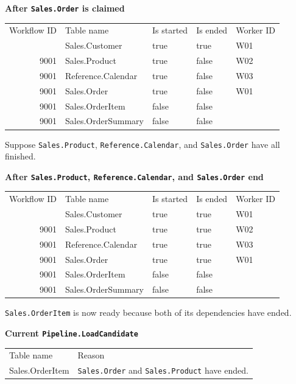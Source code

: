 \documentclass[10pt,openany,10pt]{book}
\newcounter{none}
\let\podeToprule\toprule
\let\podeMidrule\midrule
\let\podeBottomrule\bottomrule
\renewcommand{\toprule}{\arrayrulecolor{pbiGrid}\podeToprule}
\renewcommand{\midrule}{\arrayrulecolor{pbiGrid}\podeMidrule}
\renewcommand{\bottomrule}{\arrayrulecolor{pbiGrid}\podeBottomrule}
\begin{document}
\textbf{After \texttt{Sales.Order} is claimed}

{\def\LTcaptype{none} %
\begin{longtable}[]{@{}rllll@{}}
\toprule\noalign{}
Workflow ID & Table name & Is started & Is ended & Worker ID \\
\midrule\noalign{}
\endhead
\bottomrule\noalign{}
\endlastfoot
9001 & Sales.Customer & true & true & W01 \\
9001 & Sales.Product & true & false & W02 \\
9001 & Reference.Calendar & true & false & W03 \\
9001 & Sales.Order & true & false & W01 \\
9001 & Sales.OrderItem & false & false & \\
9001 & Sales.OrderSummary & false & false & \\
\end{longtable}
}

Suppose \texttt{Sales.Product}, \texttt{Reference.Calendar}, and
\texttt{Sales.Order} have all finished.

\textbf{After \texttt{Sales.Product}, \texttt{Reference.Calendar}, and
\texttt{Sales.Order} end}

{\def\LTcaptype{none} %
\begin{longtable}[]{@{}rllll@{}}
\toprule\noalign{}
Workflow ID & Table name & Is started & Is ended & Worker ID \\
\midrule\noalign{}
\endhead
\bottomrule\noalign{}
\endlastfoot
9001 & Sales.Customer & true & true & W01 \\
9001 & Sales.Product & true & true & W02 \\
9001 & Reference.Calendar & true & true & W03 \\
9001 & Sales.Order & true & true & W01 \\
9001 & Sales.OrderItem & false & false & \\
9001 & Sales.OrderSummary & false & false & \\
\end{longtable}
}

\texttt{Sales.OrderItem} is now ready because both of its dependencies
have ended.

\textbf{Current \texttt{Pipeline.LoadCandidate}}

{\def\LTcaptype{none} %
\begin{longtable}[]{@{}ll@{}}
\toprule\noalign{}
Table name & Reason \\
\midrule\noalign{}
\endhead
\bottomrule\noalign{}
\endlastfoot
Sales.OrderItem & \texttt{Sales.Order} and \texttt{Sales.Product} have
ended. \\
\end{longtable}
}
\end{document}
